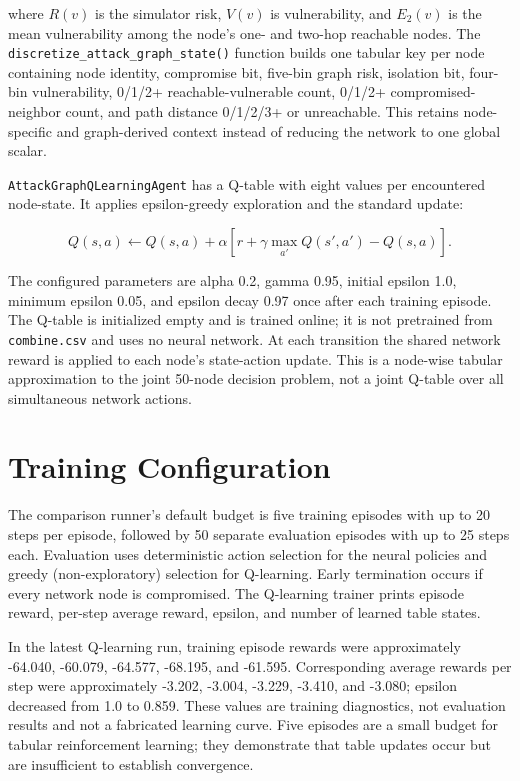 \documentclass[12pt,a4paper]{report}
\newcommand{\code}[1]{\texttt{#1}}
\begin{document}
where $R(v)$ is the simulator risk, $V(v)$ is vulnerability, and $E_2(v)$ is the mean vulnerability among the node's one- and two-hop reachable nodes. The \code{discretize\_attack\_graph\_state()} function builds one tabular key per node containing node identity, compromise bit, five-bin graph risk, isolation bit, four-bin vulnerability, 0/1/2+ reachable-vulnerable count, 0/1/2+ compromised-neighbor count, and path distance 0/1/2/3+ or unreachable. This retains node-specific and graph-derived context instead of reducing the network to one global scalar.

\code{AttackGraphQLearningAgent} has a Q-table with eight values per encountered node-state. It applies epsilon-greedy exploration and the standard update:

\begin{equation}
Q(s,a)\leftarrow Q(s,a)+\alpha\left[r+\gamma\max_{a'}Q(s',a')-Q(s,a)\right].
\end{equation}

The configured parameters are alpha 0.2, gamma 0.95, initial epsilon 1.0, minimum epsilon 0.05, and epsilon decay 0.97 once after each training episode. The Q-table is initialized empty and is trained online; it is not pretrained from \code{combine.csv} and uses no neural network. At each transition the shared network reward is applied to each node's state-action update. This is a node-wise tabular approximation to the joint 50-node decision problem, not a joint Q-table over all simultaneous network actions.

\section{Training Configuration}

The comparison runner's default budget is five training episodes with up to 20 steps per episode, followed by 50 separate evaluation episodes with up to 25 steps each. Evaluation uses deterministic action selection for the neural policies and greedy (non-exploratory) selection for Q-learning. Early termination occurs if every network node is compromised. The Q-learning trainer prints episode reward, per-step average reward, epsilon, and number of learned table states.

In the latest Q-learning run, training episode rewards were approximately -64.040, -60.079, -64.577, -68.195, and -61.595. Corresponding average rewards per step were approximately -3.202, -3.004, -3.229, -3.410, and -3.080; epsilon decreased from 1.0 to 0.859. These values are training diagnostics, not evaluation results and not a fabricated learning curve. Five episodes are a small budget for tabular reinforcement learning; they demonstrate that table updates occur but are insufficient to establish convergence.
\end{document}
